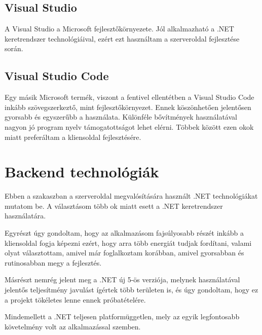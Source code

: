 \subsection{Visual Studio}
A Visual Studio\cite{vs} a Microsoft fejlesztőkörnyezete. Jól alkalmazható a .NET keretrendszer technológiáival, ezért ezt használtam a szerveroldal fejlesztése során.

\subsection{Visual Studio Code}
Egy másik Microsoft termék, viszont a fentivel ellentétben a Visual Studio Code\cite{vs-code} inkább szövegszerkeztő, mint fejlesztőkörnyezet.
Ennek köszönhetően jelentősen gyorsabb és egyszerűbb a használata. Különféle bővítmények használatával nagyon jó program nyelv támogatottságot lehet elérni.
Többek között ezen okok miatt preferáltam a kliensoldal fejlesztésére. 

\section{Backend technológiák}
Ebben a szakaszban a szerveroldal megvalósítására használt .NET technológiákat mutatom be. A választásom több ok miatt esett a .NET keretrendszer használatára.

Egyrészt úgy gondoltam, hogy az alkalmazásom fajsúlyosabb részét inkább a kliensoldal fogja képezni ezért, hogy arra több energiát tudjak fordítani, valami olyat választottam,
amivel már foglalkoztam korábban, amivel gyorsabban és rutinosabban megy a fejlesztés.

Másrészt nemrég jelent meg a .NET új 5-ös verziója, melynek használatával jelentős teljesítmény javulást ígértek több területen is, és úgy gondoltam, hogy ez a projekt tökéletes lenne
ennek próbatételére.

Mindemellett a .NET teljesen platformüggetlen, mely az egyik legfontosabb követelmény volt az alkalmazással szemben.

